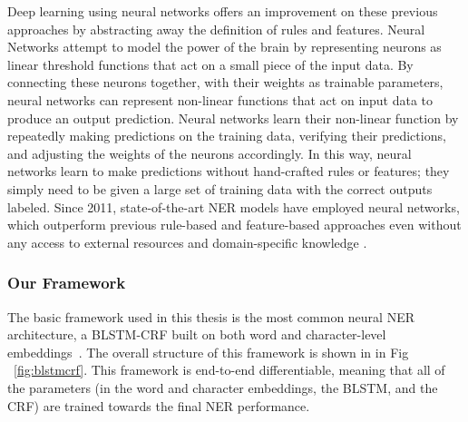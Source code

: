 Deep learning using neural networks offers an improvement on these previous approaches by abstracting away the definition of rules and features. Neural Networks attempt to model the power of the brain by representing neurons as linear threshold functions that act on a small piece of the input data. By connecting these neurons together, with their weights as trainable parameters, neural networks can represent non-linear functions that act on input data to produce an output prediction. Neural networks learn their non-linear function by repeatedly making predictions on the training data, verifying their predictions, and adjusting the weights of the neurons accordingly. In this way, neural networks learn to make predictions without hand-crafted rules or features; they simply need to be given a large set of training data with the correct outputs labeled. Since 2011, state-of-the-art NER models have employed neural networks, which outperform previous rule-based and feature-based approaches even without any access to external resources and domain-specific knowledge \citep{NeuralNERSurvey}.

\subsubsection{Our Framework}
\label{sec:ourframework}
The basic framework used in this thesis is the most common neural NER architecture, a BLSTM-CRF built on both word and character-level embeddings~\citep{DBLP:conf/acl/MaH16}. The overall structure of this framework is shown in in Fig ~\ref{fig:blstmcrf}. This framework is end-to-end differentiable, meaning that all of the parameters (in the word and character embeddings, the BLSTM, and the CRF) are trained towards the final NER performance.

